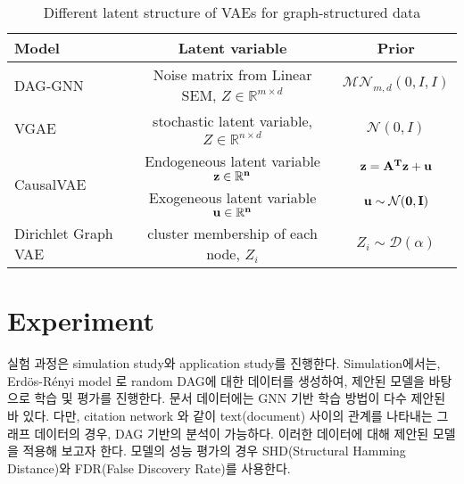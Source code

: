 \documentclass[10pt]{article}
\begin{document}
\begin{table}[h!]
    \centering
    \begin{tabular}{|l|c|c|}
        \hline
        \textbf{Model} & \textbf{Latent variable} & \textbf{Prior} \\
        \hline
        DAG-GNN\cite{yu2019daggnn} & Noise matrix from Linear SEM, $Z\in\mathbb{R}^{m\times d}$& $\mathcal{MN}_{m,d}(0,I,I)$ \\
        \hline
        VGAE\cite{kipf2016variational} & stochastic latent variable, $Z\in\mathbb{R}^{n\times d}$ & $\mathcal{N}(0,I)$ \\
        \hline
        \multirow{2}{4em}{CausalVAE\cite{Yang_2021_CVPR}} & Endogeneous latent variable $\bf z\in\mathbb{R}^n$ & $\bf z = \mathbf{A}^T \bf z + \bf u$ \\
        & Exogeneous latent variable $\bf u\in\mathbb{R}^n$ & $\bf u\sim\mathcal{N}(0,I)$ \\
        \hline
        Dirichlet Graph VAE\cite{li2020dirichlet} & cluster membership of each node, $Z_i$ & $Z_i\sim\mathcal{D}(\alpha)$ \\
        \hline
        \end{tabular}
        \caption{Different latent structure of VAEs for graph-structured data}
\end{table}

\section{Experiment}

실험 과정은 simulation study와 application study를 진행한다. Simulation에서는, Erdös-Rényi model \cite{erdds1959random}로 random DAG에 대한 데이터를 생성하여, 제안된 모델을 바탕으로 학습 및 평가를 진행한다. 문서 데이터에는 GNN 기반 학습 방법이 다수 제안된 바 있다. \cite{peng2017crosssentence,marcheggiani2017encoding,schlichtkrull2017modeling,zhang2020document} 다만, citation network \cite{CLOUGH2016235} 와 같이 text(document) 사이의 관계를 나타내는 그래프 데이터의 경우, DAG 기반의 분석이 가능하다. \cite{wuetal2011} 이러한 데이터에 대해 제안된 모델을 적용해 보고자 한다. 모델의 성능 평가의 경우 SHD(Structural Hamming Distance)와 FDR(False Discovery Rate)를 사용한다. \cite{yu2019daggnn}




\end{document}
